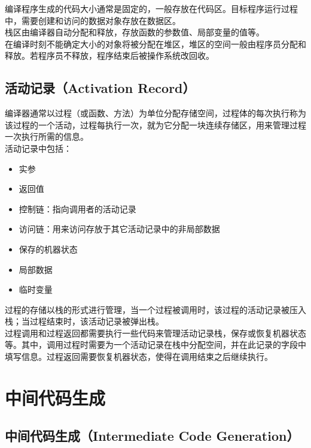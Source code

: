 编译程序生成的代码大小通常是固定的，一般存放在代码区。目标程序运行过程中，需要创建和访问的数据对象存放在数据区。\\

栈区由编译器自动分配和释放，存放函数的参数值、局部变量的值等。\\

在编译时刻不能确定大小的对象将被分配在堆区，堆区的空间一般由程序员分配和释放。若程序员不释放，程序结束后被操作系统改回收。\\

\subsection{活动记录（Activation Record）}

编译器通常以过程（或函数、方法）为单位分配存储空间，过程体的每次执行称为该过程的一个活动，过程每执行一次，就为它分配一块连续存储区，用来管理过程一次执行所需的信息。\\

活动记录中包括：

\begin{itemize}
    \item 实参
    \item 返回值
    \item 控制链：指向调用者的活动记录
    \item 访问链：用来访问存放于其它活动记录中的非局部数据
    \item 保存的机器状态
    \item 局部数据
    \item 临时变量
\end{itemize}

过程的存储以栈的形式进行管理，当一个过程被调用时，该过程的活动记录被压入栈；当过程结束时，该活动记录被弹出栈。\\

过程调用和过程返回都需要执行一些代码来管理活动记录栈，保存或恢复机器状态等。其中，调用过程时需要为一个活动记录在栈中分配空间，并在此记录的字段中填写信息。过程返回需要恢复机器状态，使得在调用结束之后继续执行。

\newpage

\section{中间代码生成}

\subsection{中间代码生成（Intermediate Code Generation）}

